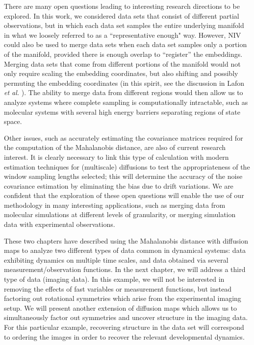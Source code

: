 There are many open questions leading to interesting research directions to be explored.
%
In this work, we considered data sets that consist of different partial observations, but in which each data set samples the entire underlying manifold in
what we loosely referred to as a ``representative enough" way.
%
However, NIV could also be used to merge data sets when each data set samples only a portion of the manifold, provided there is enough overlap to ``register'' the embeddings.
%
Merging data sets that come from different portions of the manifold would not only require scaling the embedding coordinates,
but also shifting and possibly permuting the embedding coordinates (in this spirit, see the discussion in Lafon {\em et al.} \cite{lafon2006data}).
%
The ability to merge data from different regions would then allow us to analyze systems where complete sampling is computationally intractable,
such as molecular systems with several high energy barriers separating regions of state space.

Other issues, such as accurately estimating the covariance matrices required for the computation of the Mahalanobis distance, are also of current research interest.
%
It is clearly necessary to link this type of calculation with modern estimation techniques for (multiscale) diffusions \cite{ait2002maximum, ait2003effects, ait2008closed}
to test the appropriateness of the window sampling lengths selected; this will determine the accuracy of the noise covariance estimation by eliminating
the bias due to drift variations.
%
We are confident that the exploration of these open questions will enable the use of our methodology in many interesting applications, such as merging data from molecular simulations at different levels of granularity, or merging simulation data with experimental observations.

These two chapters have described using the Mahalanobis distance with diffusion maps to analyze two different types of data common in dynamical systems: data exhibiting dynamics on multiple time scales, and data obtained via several measurement/observation functions. 
%
In the next chapter, we will address a third type of data (imaging data). 
%
In this example, we will not be interested in removing the effects of fast variables or measurement functions, but instead factoring out rotational symmetries which arise from the experimental imaging setup. 
%
We will present another extension of diffusion maps which allows us to simultaneously factor out symmetries and uncover structure in the imaging data. 
%
For this particular example, recovering structure in the data set will correspond to ordering the images in order to recover the relevant developmental dynamics. 


